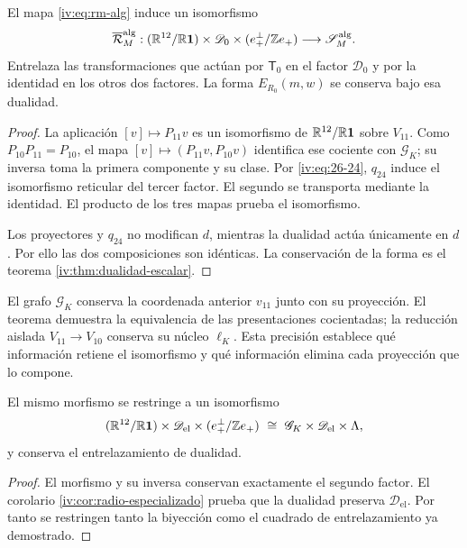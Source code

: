 \begin{theorem}
\label{iv:thm:pantallas-isomorfas}
\label{thm:k-pantallas-coordinadas}
El mapa \eqref{iv:eq:rm-alg} induce un isomorfismo
\[
 \overline{\mathcal R}_M^{\mathrm{alg}}:
 (\mathbb R^{12}/\mathbb R\mathbf1)\times\mathscr D_0
 \times(e_+^\perp/\mathbb Z e_+)
 \longrightarrow\mathscr S_M^{\mathrm{alg}}.
\]
Entrelaza las transformaciones que actúan por \(\mathsf T_0\)
en el factor \(\mathscr D_0\) y por la identidad en los
otros dos factores. La forma \(E_{R_0}(m,w)\) se conserva
bajo esa dualidad.
\end{theorem}
\begin{proof}
La aplicación \([v]\mapsto P_{11}v\) es un isomorfismo
de \(\mathbb R^{12}/\mathbb R\mathbf1\) sobre \(V_{11}\).
Como \(P_{10}P_{11}=P_{10}\), el mapa
\([v]\mapsto(P_{11}v,P_{10}v)\) identifica ese cociente
con \(\mathscr G_K\); su inversa toma la primera componente
y su clase. Por \eqref{iv:eq:26-24}, \(q_{24}\) induce el
isomorfismo reticular del tercer factor. El segundo se
transporta mediante la identidad. El producto de los tres
mapas prueba el isomorfismo.

Los proyectores y \(q_{24}\) no modifican \(d\), mientras
la dualidad actúa únicamente en \(d\). Por ello las dos
composiciones son idénticas. La conservación de la forma
es el teorema \ref{iv:thm:dualidad-escalar}.
\end{proof}

El grafo \(\mathscr G_K\) conserva la coordenada anterior
\(v_{11}\) junto con su proyección. El teorema demuestra
la equivalencia de las presentaciones cocientadas; la reducción
aislada \(V_{11}\to V_{10}\) conserva su núcleo
\(\ell_K\). Esta precisión establece qué información
retiene el isomorfismo y qué información elimina cada
proyección que lo compone.

\begin{corollary}
El mismo morfismo se restringe a un isomorfismo
\[
 (\mathbb R^{12}/\mathbb R\mathbf1)\times\mathscr D_{\mathrm{el}}
 \times(e_+^\perp/\mathbb Z e_+)
 \ \cong\ \mathscr G_K\times\mathscr D_{\mathrm{el}}\times\Lambda,
\]
y conserva el entrelazamiento de dualidad.
\end{corollary}
\begin{proof}
El morfismo y su inversa conservan exactamente el segundo factor.
El corolario \ref{iv:cor:radio-especializado} prueba que la dualidad
preserva \(\mathscr D_{\mathrm{el}}\). Por tanto se restringen
tanto la biyección como el cuadrado de entrelazamiento ya demostrado.
\end{proof}

